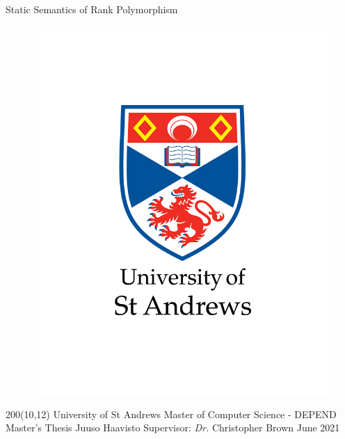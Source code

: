 \documentclass{report}
\begin{document}
\begin{titlepage}
    $ $ %
    \vspace{4cm}
    \begin{center}
        \huge{Static Semantics of Rank Polymorphism}
    \end{center}

    \begin{figure}[ht]
        \centering
        \begin{minipage}[b]{0.35\textwidth}
            \includegraphics[width=\textwidth]{./assets/01-standard-vertical-black-text.png}
        \end{minipage}
    \end{figure}

    \begin{textblock}{200}(10,12)%
    \obeylines
    \setlength{\parskip}{0cm}
        University of St Andrews
        Master of Computer Science - DEPEND
        Master's Thesis
        Juuso Haavisto
        Supervisor: \textit{Dr.} Christopher Brown
        June 2021
    \end{textblock}%

\end{titlepage}
\end{document}
